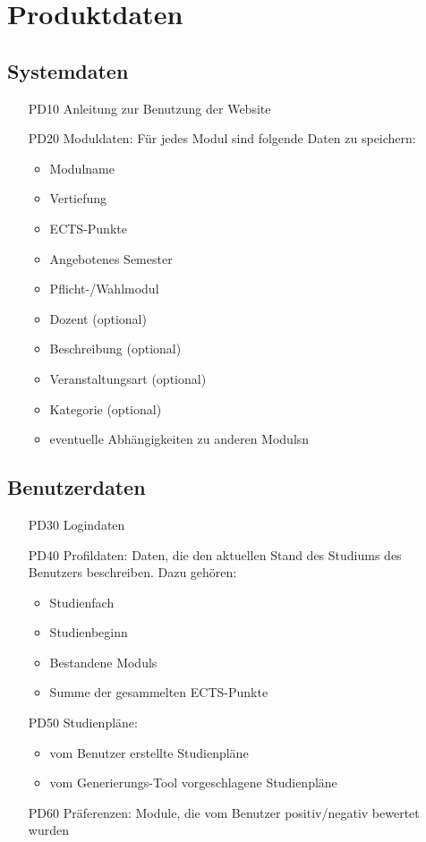 \section{Produktdaten}

\subsection{Systemdaten}
	
\begin{itemize}[nosep]
	\item[PD10]Anleitung zur Benutzung der Website
	\item[PD20] \gls{Modul}daten: Für jedes \gls{Modul} sind folgende Daten zu speichern:
	\begin{itemize}
		\item \gls{Modul}name
		\item Vertiefung
		\item \gls{ECTS-Punkte}
		\item Angebotenes Semester	
		\item Pflicht-/Wahlmodul 	
		\item Dozent (optional)
		\item Beschreibung (optional)
		\item Veranstaltungsart (optional)
		\item Kategorie (optional)
		\item eventuelle Abhängigkeiten zu anderen \glspl{Modul}n
	\end{itemize}
	 
\end{itemize}

\subsection{Benutzerdaten}
\label{subsec:product_data-benutzerdaten}  %

\begin{itemize}[nosep]
	\item[PD30]Logindaten
	\item[PD40]Profildaten: Daten, die den aktuellen Stand des Studiums des Benutzers beschreiben. Dazu gehören: 
	\begin{itemize}
		\item Studienfach
		\item Studienbeginn	
		\item Bestandene \glspl{Modul} 
		\item Summe der gesammelten \gls{ECTS-Punkte}
	\end{itemize}
	\item[PD50] Studienpläne:
	\begin{itemize}
		\item 	vom Benutzer erstellte Studienpläne 
		\item	vom \gls{Generierungs-Tool} vorgeschlagene Studienpläne 
	\end{itemize} 
	\item[PD60] Präferenzen: Module, die vom Benutzer positiv/negativ bewertet wurden
\end{itemize}